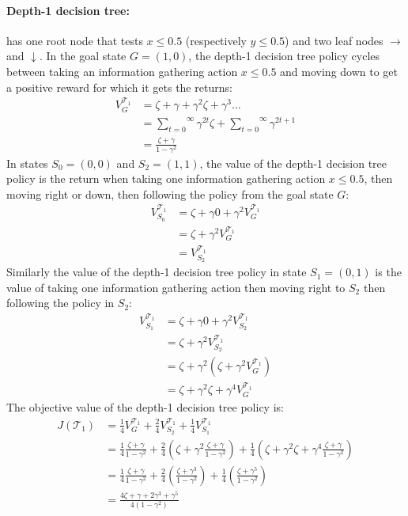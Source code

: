 \paragraph{Depth-1 decision tree:} has one root node that tests $x\leq0.5$ (respectively $y\leq0.5$) and two leaf nodes $\rightarrow$ and $\downarrow$. 
In the goal state $G = (1, 0)$, the depth-1 decision tree policy cycles between taking an information gathering action $x\leq0.5$ and moving down to get a positive reward for which it gets the returns:
\begin{align*}
    V^{\mathcal{T}_1}_G &= \zeta + \gamma + \gamma^2 \zeta + \gamma^3 \dots \\
    &= \overset{\infty}{\underset{t=0}\sum} \gamma^{2t} \zeta + \overset{\infty}{\underset{t=0}\sum} \gamma^{2t+1} \\
    &= \frac{\zeta + \gamma}{1 - \gamma^2}
\end{align*}
In states $S_0=(0,0)$ and $S_2=(1, 1)$, the value of the depth-1 decision tree policy is the return when taking one information gathering action $x\leq0.5$, then moving right or down, then following the policy from the goal state $G$:
\begin{align*}
    V^{\mathcal{T}_1}_{S_0} &= \zeta + \gamma 0 + \gamma^2 V^{\mathcal{T}_1}_G \\
    &= \zeta + \gamma^2 V^{\mathcal{T}_1}_G \\
    &= V^{\mathcal{T}_1}_{S_2}
\end{align*}
Similarly the value of the depth-1 decision tree policy in state $S_1=(0,1)$ is the value of taking one information gathering action then moving right to $S_2$ then following the policy in $S_2$:
\begin{align*}
    V^{\mathcal{T}_1}_{S_1} &= \zeta + \gamma 0 + \gamma^2 V^{\mathcal{T}_1}_{S_2} \\
    &= \zeta + \gamma^2 V^{\mathcal{T}_1}_{S_2} \\
    &= \zeta + \gamma^2 (\zeta + \gamma^2 V^{\mathcal{T}_1}_G) \\
    &= \zeta + \gamma^2 \zeta + \gamma^4 V^{\mathcal{T}_1}_G
\end{align*}
The objective value of the depth-1 decision tree policy is:
\begin{align*}
    J(\mathcal{T}_1) &= \frac{1}{4} V^{\mathcal{T}_1}_G + \frac{2}{4} V^{\mathcal{T}_1}_{S_2} + \frac{1}{4} V^{\mathcal{T}_1}_{S_1} \\
    &= \frac{1}{4} \frac{\zeta + \gamma}{1 - \gamma^2} + \frac{2}{4} (\zeta + \gamma^2 \frac{\zeta + \gamma}{1 - \gamma^2}) + \frac{1}{4} (\zeta + \gamma^2 \zeta + \gamma^4 \frac{\zeta + \gamma}{1 - \gamma^2}) \\
    &= \frac{1}{4} \frac{\zeta + \gamma}{1 - \gamma^2} + \frac{2}{4} (\frac{\zeta + \gamma ^ 3}{1-\gamma^2}) + \frac{1}{4}(\frac{\zeta+\gamma^5}{1-\gamma^2}) \\
    &= \frac{4\zeta + \gamma + 2\gamma^3 + \gamma^5}{4(1-\gamma^2)}
\end{align*}

